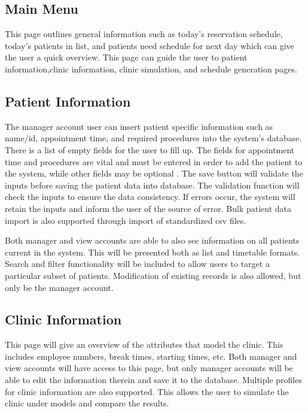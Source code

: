 \documentclass[12pt]{article}
\begin{document}
\subsection{Main Menu}
This page outlines general information such as today’s reservation schedule, today’s patients in list, and patients need schedule for next day which can give the user a quick overview. This page can guide the user to patient information,clinic information, clinic simulation, and schedule generation pages.

\subsection{Patient Information}
The manager account user can insert patient specific information such as name/id, appointment time, and required procedures into the system’s database. There is a list of empty fields for the user to fill up. The fields for appointment time and procedures are vital and must be entered in order to add the patient to the system, while other fields may be optional . The save button will validate the inputs before saving the patient data into database. The validation function will check the inputs to ensure the data consistency. If errors occur, the system will retain the inputs and inform the user of the source of error. Bulk patient data import is also supported through import of standardized csv files.

\noindent \newline
Both manager and view accounts are able to also see information on all patients current in the system. This will be presented both as list and timetable formats. Search and filter functionality will be included to allow users to target a particular subset of patients. Modification of existing records is also allowed, but only be the manager account.

\subsection{Clinic Information}
This page will give an overview of the attributes that model the clinic. This includes employee numbers, break times, starting times, etc. Both manager and view accounts will have access to this page, but only manager accounts will be able to edit the information therein and save it to the database. Multiple profiles for clinic information are also supported. This allows the user to simulate the clinic under models and compare the results.
\end{document}
